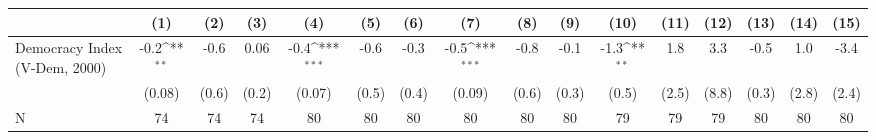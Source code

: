 {
\def\sym#1{\ifmmode^{#1}\else\(^{#1}\)\fi}
\begin{tabular}{l*{15}{c}}
\hline\hline
                    &\multicolumn{1}{c}{(1)}         &\multicolumn{1}{c}{(2)}         &\multicolumn{1}{c}{(3)}         &\multicolumn{1}{c}{(4)}         &\multicolumn{1}{c}{(5)}         &\multicolumn{1}{c}{(6)}         &\multicolumn{1}{c}{(7)}         &\multicolumn{1}{c}{(8)}         &\multicolumn{1}{c}{(9)}         &\multicolumn{1}{c}{(10)}         &\multicolumn{1}{c}{(11)}         &\multicolumn{1}{c}{(12)}         &\multicolumn{1}{c}{(13)}         &\multicolumn{1}{c}{(14)}         &\multicolumn{1}{c}{(15)}         \\
\hline
Democracy Index (V-Dem, 2000)&        -0.2\sym{**} &        -0.6         &        0.06         &        -0.4\sym{***}&        -0.6         &        -0.3         &        -0.5\sym{***}&        -0.8         &        -0.1         &        -1.3\sym{**} &         1.8         &         3.3         &        -0.5         &         1.0         &        -3.4         \\
                    &      (0.08)         &       (0.6)         &       (0.2)         &      (0.07)         &       (0.5)         &       (0.4)         &      (0.09)         &       (0.6)         &       (0.3)         &       (0.5)         &       (2.5)         &       (8.8)         &       (0.3)         &       (2.8)         &       (2.4)         \\
\hline
N                   &          74         &          74         &          74         &          80         &          80         &          80         &          80         &          80         &          80         &          79         &          79         &          79         &          80         &          80         &          80         \\
\hline\hline
\end{tabular}
}
